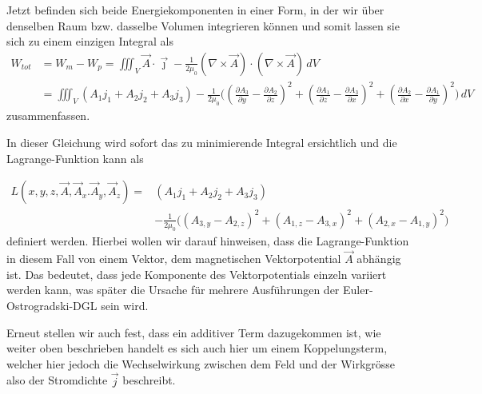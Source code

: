 Jetzt befinden sich beide Energiekomponenten in einer Form, in der wir über denselben Raum bzw. dasselbe Volumen integrieren können und somit lassen sie sich zu einem einzigen Integral als 
\begin{align*}
W_{tot} 
&=
W_m - W_p
=
\iiint_V \vec{A}\cdot\vec{\jmath}
- \frac{1}{2\mu_0}\left(\nabla\times\vec{A}\right)\cdot\left(\nabla\times\vec{A}\right)\, dV \\
&=
\iiint_V \left( A_1j_1 + A_2j_2 + A_3j_3\right) - 
 \frac{1}{2\mu_0}\biggl( 
 	\left( \frac{\partial A_3}{\partial y} -\frac{\partial A_2}{\partial z}\right)^2 
 + \left( \frac{\partial A_1}{\partial z} -\frac{\partial A_3}{\partial x}\right)^2
 + \left(\frac{\partial A_2}{\partial x} -\frac{\partial A_1}{\partial y} \right)^2   
 \biggr) \,dV
\end{align*}
zusammenfassen.

In dieser Gleichung wird sofort das zu minimierende Integral ersichtlich und die Lagrange-Funktion kann als 

	
	\begin{align}
	\label{maxwell:magnetostatikLagrange}
	L\left(x,y,z, \vec{A}, \vec{A}_x. \vec{A}_y, \vec{A}_z\right)
	=&\left( A_1j_1 + A_2j_2 + A_3j_3\right) \\ \nonumber
	 &- \frac{1}{2\mu_0}\bigl( 
	( A_{3,y} - A_{2,z})^2 
	+ (A_{1,z} -A_{3,x})^2
	+ (A_{2,x} -A_{1,y})^2   
	\bigr)
	\end{align}
definiert werden. 
Hierbei wollen wir darauf hinweisen, dass die Lagrange-Funktion in diesem Fall von einem Vektor, dem magnetischen Vektorpotential $\vec{A}$ abhängig ist. 
Das bedeutet, dass jede Komponente des Vektorpotentials einzeln variiert werden kann, was später die Ursache für mehrere Ausführungen der Euler-Ostrogradski-DGL sein wird.

Erneut stellen wir auch fest, dass ein additiver Term dazugekommen ist, wie weiter oben beschrieben handelt es sich auch hier um einem Koppelungsterm, welcher hier jedoch die Wechselwirkung zwischen dem Feld und der Wirkgrösse also der Stromdichte $\vec{j}$ beschreibt.

